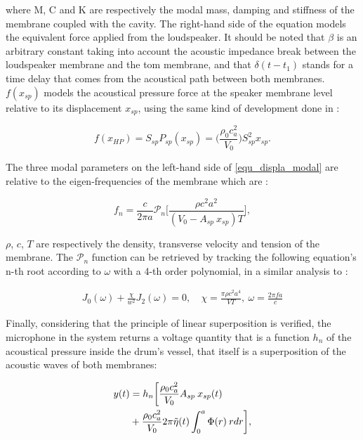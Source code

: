 \documentclass[11pt, twocolumn]{article}
\begin{document}
\noindent
where M, C and K are respectively the modal mass, damping and stiffness of the membrane coupled with the cavity. The right-hand side of the equation models the equivalent force applied from the loudspeaker. It should be noted that $\beta$ is an arbitrary constant taking into account the acoustic impedance break between the loudspeaker membrane and the tom membrane, and that $\delta(t - t_1)$ stands for a time delay that comes from the acoustical path between both membranes. $f(x_{sp})$ models the acoustical pressure force at the speaker membrane level relative to its displacement $x_{sp}$, using the same kind of development done in \cite{morse1995vibration}: 

\begin{equation}
    f(x_{HP}) = S_{sp} P_{sp}(x_{sp}) = \Bigg(\frac{\rho_0c_a^2}{V_0}\Bigg) S_{sp}^2 x_{sp}.
\end{equation}

\vspace{5pt}
\noindent

The three modal parameters on the left-hand side of \eqref{equ_displa_modal} are relative to the eigen-frequencies of the membrane which are :

\begin{equation}
    f_n = \frac{c}{2 \pi a} \mathcal{P}_n \bigg[ \frac{\rho c^2 a^2}{(V_0 -  A_{sp} \: x_{sp}) T} \bigg],
\end{equation}

\noindent
$\rho$, $c$, $T$ are respectively the density, transverse velocity and tension of the membrane. The $\mathcal{P}_n$ function can be retrieved by tracking the following equation's n-th root according to $\omega$ with a 4-th order polynomial, in a similar analysis to \cite{morse1995vibration}: 

\begin{align}
    J_0(\omega)  +\frac{\chi}{w^2} J_2(\omega) = 0, ~&\chi=\frac{\pi \rho c^2 a^4}{VT}, ~\omega = \frac{2\pi f a}{c}
\end{align}


\noindent
Finally, considering that the principle of linear superposition is verified, the microphone in the system returns a voltage quantity that is a function $h_n$ of the acoustical pressure inside the drum's vessel, that itself is a superposition of the acoustic waves of both membranes:

\begin{align}
    y(t) &= h_n \bigg[ \frac{\rho_0 c_a^2}{V_0} A_{sp} \: x_{sp}(t) \nonumber \\
    &+ \frac{\rho_0 c_a^2}{V_0} 2 \pi \Tilde{\eta}(t) \int_0^a \Phi(r) \: r dr  \bigg],
    \label{eq_observation_y}
\end{align}
\end{document}
